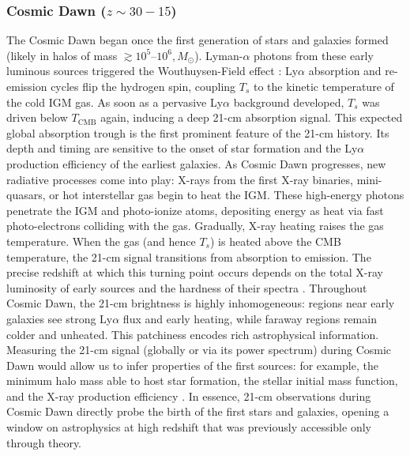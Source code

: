 \documentclass[floats,floatfix,showpacs,amssymb,prd,superscriptaddress,nofootinbib, 11pt]{revtex4-2} %
\begin{document}
\subsubsection{Cosmic Dawn ($z \sim 30-15$)}
The Cosmic Dawn began once the first generation of stars and galaxies formed (likely in halos of mass $\gtrsim10^5$–$10^6,M_\odot$). Lyman-$\alpha$ photons from these early luminous sources triggered the Wouthuysen-Field effect \citep{Wouthuysen_1952, Field_1958}: Ly$\alpha$ absorption and re-emission cycles flip the hydrogen spin, coupling $T_s$ to the kinetic temperature of the cold IGM gas. As soon as a pervasive Ly$\alpha$ background developed, $T_s$ was driven below $T_{\text{CMB}}$ again, inducing a deep 21-cm absorption signal. This expected global absorption trough is the first prominent feature of the 21-cm history. %
Its depth and timing are sensitive to the onset of star formation and the Ly$\alpha$ production efficiency of the earliest galaxies. As Cosmic Dawn progresses, new radiative processes come into play: X-rays from the first X-ray binaries, mini-quasars, or hot interstellar gas begin to heat the IGM. These high-energy photons penetrate the IGM and photo-ionize atoms, depositing energy as heat via fast photo-electrons colliding with the gas. Gradually, X-ray heating raises the gas temperature. When the gas (and hence $T_s$) is heated above the CMB temperature, the 21-cm signal transitions from absorption to emission. The precise redshift at which this turning point occurs depends on the total X-ray luminosity of early sources and the hardness of their spectra \citep{Fialkov_2014b, Mirocha_2017}. Throughout Cosmic Dawn, the 21-cm brightness is highly inhomogeneous: regions near early galaxies see strong Ly$\alpha$ flux and early heating, while faraway regions remain colder and unheated. This patchiness encodes rich astrophysical information. Measuring the 21-cm signal (globally or via its power spectrum) during Cosmic Dawn would allow us to infer properties of the first sources: for example, the minimum halo mass able to host star formation, the stellar initial mass function, and the X-ray production efficiency \citep{Pober_2014}.
In essence, 21-cm observations during Cosmic Dawn directly probe the birth of the first stars and galaxies, opening a window on astrophysics at high redshift that was previously accessible only through theory.
\end{document}

